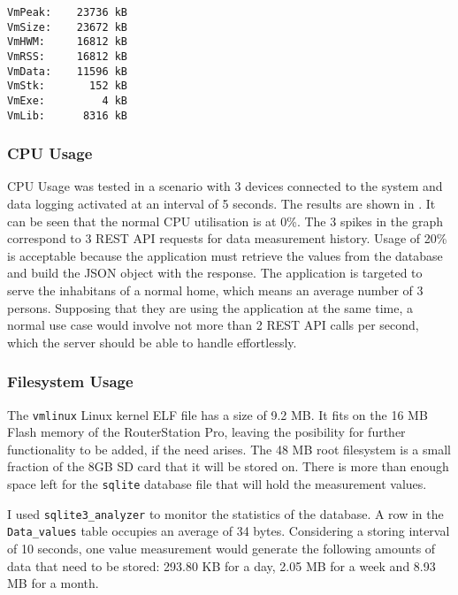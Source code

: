 \lstset{language=make,caption=Server Process Memory usage values,label=lst:mem}
\begin{lstlisting}
VmPeak:    23736 kB
VmSize:    23672 kB
VmHWM:     16812 kB
VmRSS:     16812 kB
VmData:    11596 kB
VmStk:       152 kB
VmExe:         4 kB
VmLib:      8316 kB
\end{lstlisting}

\subsubsection{CPU Usage}


CPU Usage was tested in a scenario with 3 devices connected to the system and data logging activated at an interval of 5 seconds. The results are shown in . It can be seen that the normal CPU utilisation is at 0\%. The 3 spikes in the graph correspond to 3 REST API requests for data measurement history. Usage of 20\% is acceptable because the application must retrieve the values from the database and build the JSON object with the response. The application is targeted to serve the inhabitans of a normal home, which means an average number of 3 persons. Supposing that they are using the application at the same time, a normal use case would involve not more than 2 REST API calls per second, which the server should be able to handle effortlessly.

\subsubsection{Filesystem Usage}

The \texttt{vmlinux} Linux kernel ELF file has a size of 9.2 MB. It fits on the 16 MB Flash memory of the RouterStation Pro, leaving the posibility for further functionality to be added, if the need arises. The 48 MB root filesystem is a small fraction of the 8GB SD card that it will be stored on. There is more than enough space left for the \texttt{sqlite} database file that will hold the measurement values.

I used \texttt{sqlite3_analyzer} to monitor the statistics of the database. A row in the \texttt{Data_values} table occupies an average of 34 bytes. Considering a storing interval of 10 seconds, one value measurement would generate the following amounts of data that need to be stored: 293.80 KB for a day, 2.05 MB for a week and 8.93 MB for a month.

